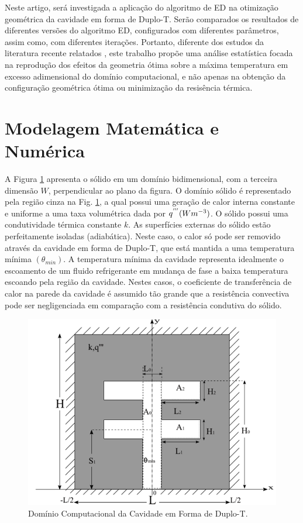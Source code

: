 \documentclass[12pt,A4,A4pt]{article}
\begin{document}
Neste artigo, será investigada a aplicação do algoritmo de ED na otimização geométrica da cavidade em forma de Duplo-T. Serão comparados os resultados de diferentes versões do algoritmo ED, configurados com diferentes parâmetros, assim como, com diferentes iterações. Portanto, diferente dos estudos da literatura recente relatados \cite{Gonzales2017, Gonzales2018}, este trabalho propõe uma análise estatística focada na reprodução dos efeitos da geometria ótima sobre a máxima temperatura em excesso adimensional do domínio computacional, e não apenas na obtenção da configuração geométrica ótima ou minimização da resisência térmica.

\section{Modelagem Matemática e Numérica}
\label{modelo}
\hspace{0.5cm}A Figura \ref{figure01} apresenta o sólido em um domínio bidimensional, com a terceira dimensão $W$, perpendicular ao plano da figura. O domínio sólido é representado pela região cinza na Fig. \ref{figure01}, a qual possui uma geração de calor interna constante e uniforme a uma taxa volumétrica dada por $q^{'''}(Wm^{\tiny -3})$. O sólido possui uma condutividade térmica constante $k$. As superfícies externas do sólido estão perfeitamente isoladas (adiabática). Neste caso, o calor só pode ser removido através da cavidade em forma de Duplo-T, que está mantida a uma temperatura mínima $(\theta_{min})$. A temperatura mínima da cavidade representa idealmente o escoamento de um fluido refrigerante em mudança de fase a baixa temperatura escoando pela região da cavidade. Nestes casos, o coeficiente de transferência de calor na parede da cavidade é assumido tão grande que a resistência convectiva pode ser negligenciada em comparação com a resistência condutiva do sólido.

\begin{figure}[h!]
\centering
\includegraphics[width=0.7\linewidth]{imgs/duplo_t.png}
\caption{ {\small Domínio Computacional da Cavidade em Forma de Duplo-T.}}
\label{figure01}
\end{figure}
\end{document}
